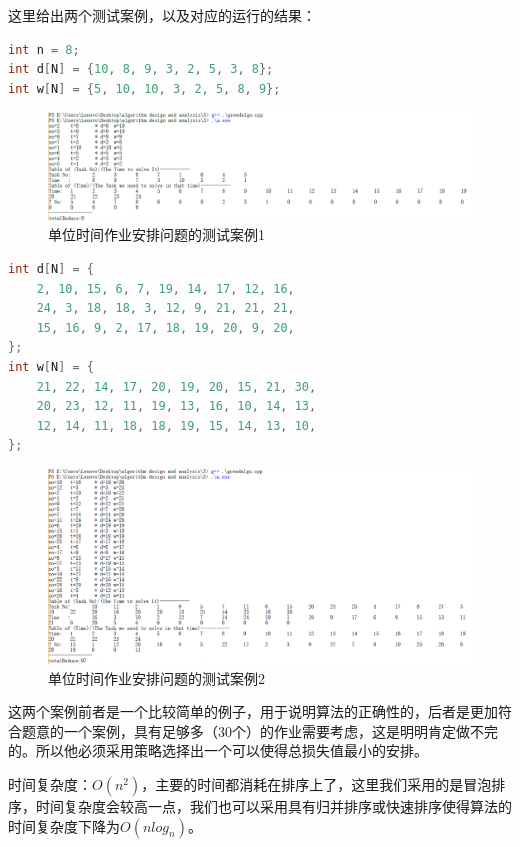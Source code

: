 \documentclass[11pt]{ctexart}
\begin{document}
这里给出两个测试案例，以及对应的运行的结果：
\begin{lstlisting}[language=c++,basicstyle=\footnotesize]
int n = 8;
int d[N] = {10, 8, 9, 3, 2, 5, 3, 8};
int w[N] = {5, 10, 10, 3, 2, 5, 8, 9};
\end{lstlisting}
\begin{figure}[H]
\centering
\includegraphics[scale=0.45]{greedalgo1.png}
\caption{单位时间作业安排问题的测试案例1}
\end{figure}
\begin{lstlisting}[language=C++,basicstyle=\footnotesize]
int d[N] = {
    2, 10, 15, 6, 7, 19, 14, 17, 12, 16, 
    24, 3, 18, 18, 3, 12, 9, 21, 21, 21,
    15, 16, 9, 2, 17, 18, 19, 20, 9, 20,
};
int w[N] = {
    21, 22, 14, 17, 20, 19, 20, 15, 21, 30,
    20, 23, 12, 11, 19, 13, 16, 10, 14, 13,
    12, 14, 11, 18, 18, 19, 15, 14, 13, 10,
};
\end{lstlisting}
\begin{figure}[H]
\centering
\includegraphics[scale=0.45]{greedalgo2.png}
\caption{单位时间作业安排问题的测试案例2}
\end{figure}

这两个案例前者是一个比较简单的例子，用于说明算法的正确性的，后者是更加符合题意的一个案例，具有足够多（30个）的作业需要考虑，这是明明肯定做不完的。所以他必须采用策略选择出一个可以使得总损失值最小的安排。

时间复杂度：$O(n^2)$，主要的时间都消耗在排序上了，这里我们采用的是冒泡排序，时间复杂度会较高一点，我们也可以采用具有归并排序或快速排序使得算法的时间复杂度下降为$O(nlog_n)$。
\end{document}

